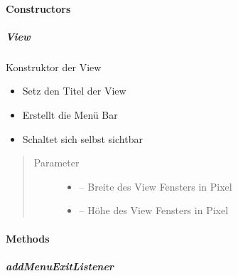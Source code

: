 \documentclass[letterpaper,10pt,ngerman]{sphinxmanual}
\begin{document}
\paragraph{Constructors}
\label{\detokenize{com/linuxluigi/edu/view/View:constructors}}

\subparagraph{View}
\label{\detokenize{com/linuxluigi/edu/view/View:id1}}

\begin{fulllineitems}
\label{\detokenize{com/linuxluigi/edu/view/View:com.linuxluigi.edu.view.View.View(int, int)}}
Konstruktor der View
\begin{itemize}
\item {} 
Setz den Titel der View

\item {} 
Erstellt die Menü Bar

\item {} 
Schaltet sich selbst sichtbar

\end{itemize}
\begin{quote}\begin{description}
\item[{Parameter}] \leavevmode\begin{itemize}
\item {} 
 -- Breite des View Fensters in Pixel

\item {} 
 -- Höhe des View Fensters in Pixel

\end{itemize}

\end{description}\end{quote}

\end{fulllineitems}



\paragraph{Methods}
\label{\detokenize{com/linuxluigi/edu/view/View:methods}}

\subparagraph{addMenuExitListener}
\label{\detokenize{com/linuxluigi/edu/view/View:addmenuexitlistener}}
\end{document}
